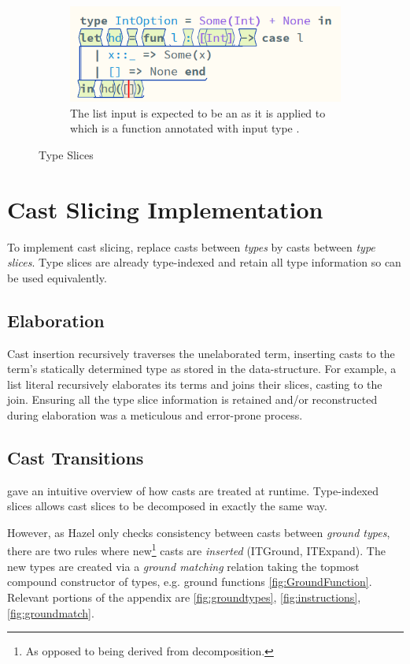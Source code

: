 \begin{figure}[h]
\begin{subfigure}[t]{0.45\textwidth}
\centering
\includegraphics[width=1\textwidth]{Media/Figures/list_ana}
\caption{The list input is expected to be an \code{[Int]} as it is applied to  which is a function annotated with input type \code{[Int]}.}
\end{subfigure}
\caption{Type Slices}
\label{fig:SliceExamples}
\end{figure}

\section{Cast Slicing Implementation}\label{sec:CastSlicingImplementation}
To implement cast slicing, replace casts between \textit{types} by casts between \textit{type slices}. Type slices are already type-indexed and retain all type information so can be used equivalently.

\subsection{Elaboration}\label{sec:Elaboration}
Cast insertion recursively traverses the unelaborated term, inserting casts to the term's statically determined type as stored in the  data-structure. For example, a list literal recursively elaborates its terms and joins their slices, casting to the join. Ensuring all the type slice information is retained and/or reconstructed during elaboration was a meticulous and error-prone process.

\subsection{Cast Transitions}
 gave an intuitive overview of how casts are treated at runtime. Type-indexed slices allows cast slices to be decomposed in exactly the same way. 

However, as Hazel only checks consistency between casts between \textit{ground types}, there are two rules where new\footnote{As opposed to being derived from decomposition.} casts are \textit{inserted} (ITGround, ITExpand). The new types are created via a \textit{ground matching} relation taking the topmost compound constructor of types, e.g. ground functions \cref{fig:GroundFunction}. Relevant portions of the appendix are \cref{fig:groundtypes}, \cref{fig:instructions}, \cref{fig:groundmatch}.

